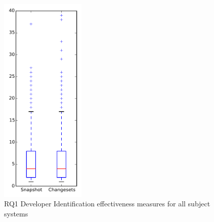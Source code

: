 
\begin{figure}[t]
\centering
\includegraphics[width=0.36\textwidth]{figures/dit/rq1_overview}
\caption{RQ1 Developer Identification effectiveness measures for all subject systems}
\label{fig:dit:rq1:overview}
\end{figure}
